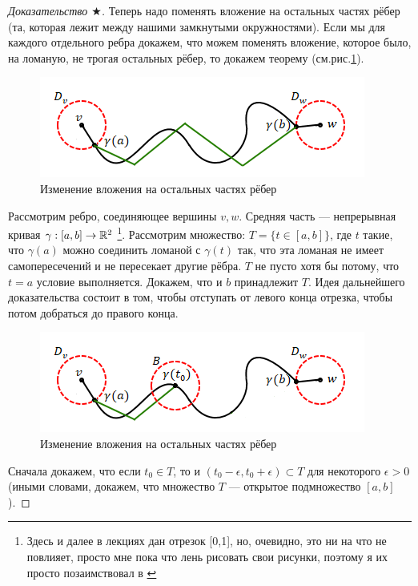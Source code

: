 \begin{proof}[Доказательство $\bigstar$]
    Теперь надо поменять вложение на остальных частях рёбер (та, которая лежит между нашими замкнутыми окружностями). Если мы для каждого отдельного ребра докажем, что можем поменять вложение, которое было, на ломаную, не трогая остальных рёбер, то докажем теорему (см.рис.\ref{fig:c3.7}).

    \begin{figure}[h]
        \centering
        \includegraphics[scale=0.7]{images/c3.7.png}
        \caption{Изменение вложения на остальных частях рёбер}
        \label{fig:c3.7}
    \end{figure}

    Рассмотрим ребро, соединяющее вершины $v, w$. Средняя часть — непрерывная кривая $\gamma: [a,b] \to \mathbb{R}^2$ \footnote{Здесь и далее в лекциях дан отрезок [0,1], но, очевидно, это ни на что не повлияет, просто мне пока что лень рисовать свои рисунки, поэтому я их просто позаимствовал в \cite{oshemkov}}. Рассмотрим множество: $T = \{t \in [a,b]\}$, где $t$ такие, что $\gamma(a)$ можно соединить ломаной с $\gamma(t)$ так, что эта ломаная не имеет самопересечений и не пересекает другие рёбра.
    $T$ не пусто хотя бы потому, что $t = a$ условие выполняется.
    Докажем, что и $b$ принадлежит $T$.
    Идея дальнейшего доказательства состоит в том, чтобы отступать от левого конца отрезка, чтобы потом добраться до правого конца.

    \begin{figure}[h]
        \centering
        \includegraphics[scale=0.7]{images/c3.8.png}
        \caption{Изменение вложения на остальных частях рёбер}
        \label{fig:c3.8}
    \end{figure}

    Сначала докажем, что если $t_0 \in T$, то и $(t_0 - \epsilon, t_0 + \epsilon) \subset T$ для некоторого $\epsilon > 0$ (иными словами, докажем, что множество $T$ — открытое подмножество $[a,b]$).


\end{proof}
